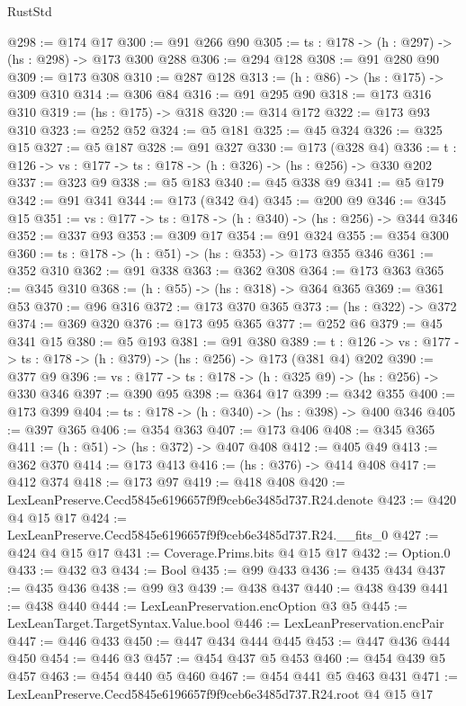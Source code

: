 \begin{lexlean}{RustStd}
\begin{coremodule}
@298 := @174 @17
@300 := @91 @266 @90
@305 := {ts : @178} -> (h : @297) -> (hs : @298) -> @173 @300 @288
@306 := @294 @128
@308 := @91 @280 @90
@309 := @173 @308
@310 := @287 @128
@313 := (h : @86) -> (hs : @175) -> @309 @310
@314 := @306 @84
@316 := @91 @295 @90
@318 := @173 @316 @310
@319 := (hs : @175) -> @318
@320 := @314 @172
@322 := @173 @93 @310
@323 := @252 @52
@324 := @5 @181
@325 := @45 @324
@326 := @325 @15
@327 := @5 @187
@328 := @91 @327
@330 := @173 (@328 @4)
@336 := {t : @126} -> {vs : @177} -> {ts : @178} -> (h : @326) -> (hs : @256) -> @330 @202
@337 := @323 @9
@338 := @5 @183
@340 := @45 @338 @9
@341 := @5 @179
@342 := @91 @341
@344 := @173 (@342 @4)
@345 := @200 @9
@346 := @345 @15
@351 := {vs : @177} -> {ts : @178} -> (h : @340) -> (hs : @256) -> @344 @346
@352 := @337 @93
@353 := @309 @17
@354 := @91 @324
@355 := @354 @300
@360 := {ts : @178} -> (h : @51) -> (hs : @353) -> @173 @355 @346
@361 := @352 @310
@362 := @91 @338
@363 := @362 @308
@364 := @173 @363
@365 := @345 @310
@368 := (h : @55) -> (hs : @318) -> @364 @365
@369 := @361 @53
@370 := @96 @316
@372 := @173 @370 @365
@373 := (hs : @322) -> @372
@374 := @369 @320
@376 := @173 @95 @365
@377 := @252 @6
@379 := @45 @341 @15
@380 := @5 @193
@381 := @91 @380
@389 := {t : @126} -> {vs : @177} -> {ts : @178} -> (h : @379) -> (hs : @256) -> @173 (@381 @4) @202
@390 := @377 @9
@396 := {vs : @177} -> {ts : @178} -> (h : @325 @9) -> (hs : @256) -> @330 @346
@397 := @390 @95
@398 := @364 @17
@399 := @342 @355
@400 := @173 @399
@404 := {ts : @178} -> (h : @340) -> (hs : @398) -> @400 @346
@405 := @397 @365
@406 := @354 @363
@407 := @173 @406
@408 := @345 @365
@411 := (h : @51) -> (hs : @372) -> @407 @408
@412 := @405 @49
@413 := @362 @370
@414 := @173 @413
@416 := (hs : @376) -> @414 @408
@417 := @412 @374
@418 := @173 @97
@419 := @418 @408
@420 := LexLeanPreserve.Cecd5845e6196657f9f9ceb6e3485d737.R24.denote
@423 := @420 @4 @15 @17
@424 := LexLeanPreserve.Cecd5845e6196657f9f9ceb6e3485d737.R24.__fits_0
@427 := @424 @4 @15 @17
@431 := Coverage.Prims.bits @4 @15 @17
@432 := Option.{0}
@433 := @432 @3
@434 := Bool
@435 := @99 @433
@436 := @435 @434
@437 := @435 @436
@438 := @99 @3
@439 := @438 @437
@440 := @438 @439
@441 := @438 @440
@444 := LexLeanPreservation.encOption @3 @5
@445 := LexLeanTarget.TargetSyntax.Value.bool
@446 := LexLeanPreservation.encPair
@447 := @446 @433
@450 := @447 @434 @444 @445
@453 := @447 @436 @444 @450
@454 := @446 @3
@457 := @454 @437 @5 @453
@460 := @454 @439 @5 @457
@463 := @454 @440 @5 @460
@467 := @454 @441 @5 @463 @431
@471 := LexLeanPreserve.Cecd5845e6196657f9f9ceb6e3485d737.R24.root @4 @15 @17

\end{coremodule}
\end{lexlean}
